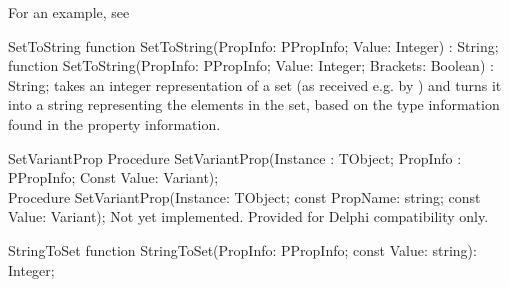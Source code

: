 For an example, see 

\begin{function}{SetToString}
\Declaration
function SetToString(PropInfo: PPropInfo; 
                     Value: Integer) : String;\\
function SetToString(PropInfo: PPropInfo; 
                     Value: Integer; Brackets: Boolean) : String;
\Description
{} takes an integer representation of a set (as received e.g.
by ) and turns it into a string representing the elements in
the set, based on the type information found in the  property
information.
\Errors
\SeeAlso
\end{function}

\begin{procedure}{SetVariantProp}
\Declaration
Procedure SetVariantProp(Instance : TObject;
                         PropInfo : PPropInfo;
                         Const Value: Variant);\\
Procedure SetVariantProp(Instance: TObject; 
                         const PropName: string; 
                         const Value: Variant);                 
\Description
Not yet implemented. Provided for Delphi compatibility only.
\Errors
\SeeAlso
\end{procedure}


\begin{function}{StringToSet}
\Declaration
function StringToSet(PropInfo: PPropInfo; const Value: string): Integer;
\Description
\Errors
\SeeAlso
\end{function}
